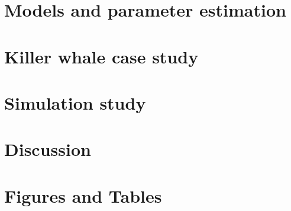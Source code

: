\documentclass[12pt]{TD-CJS}
\begin{document}
\section{Models and parameter estimation}
\label{sec:models}

%
\section{Killer whale case study}
\label{sec:data}

%
\section{Simulation study}
\label{sec:sim_study}

%
%
\section{Discussion}

%
\newpage

%
\newpage
\begin{appendix}

\end{appendix}
%
\newpage
\section{Figures and Tables}

%
\end{document}
